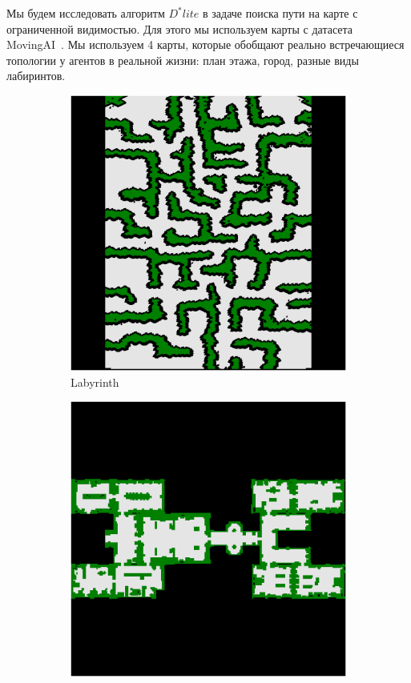 \documentclass[11pt]{article}
\begin{document}
    Мы будем исследовать алгоритм $D^* lite$ в задаче поиска пути на карте с ограниченной видимостью.
    Для этого мы используем карты с датасета MovingAI~\cite{sturtevant2012benchmarks}.
    Мы используем 4 карты, которые обобщают реально встречающиеся топологии у агентов в реальной жизни: план этажа, город, разные виды лабиринтов.
    \begin{figure}
        \centering
        \begin{subfigure}[b]{0.24\textwidth}
            \centering
            \includegraphics[width=\textwidth]{../maps/Labyrinth}
            \caption{Labyrinth}
            \label{fig:y equals x}
        \end{subfigure}
        \hfill
        \begin{subfigure}[b]{0.24\textwidth}
            \centering
            \includegraphics[width=\textwidth]{../maps/den401d}

\end{subfigure}
\end{figure}
\end{document}
